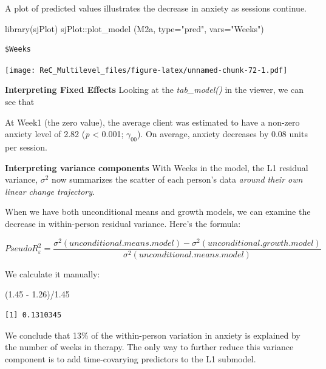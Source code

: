\documentclass[
  english,
]{book}
\newenvironment{Shaded}{\begin{snugshade}}{\end{snugshade}}
\newcommand{\AttributeTok}[1]{\textcolor[rgb]{0.77,0.63,0.00}{#1}}
\newcommand{\FloatTok}[1]{\textcolor[rgb]{0.00,0.00,0.81}{#1}}
\newcommand{\FunctionTok}[1]{\textcolor[rgb]{0.00,0.00,0.00}{#1}}
\newcommand{\NormalTok}[1]{#1}
\newcommand{\SpecialCharTok}[1]{\textcolor[rgb]{0.00,0.00,0.00}{#1}}
\newcommand{\StringTok}[1]{\textcolor[rgb]{0.31,0.60,0.02}{#1}}
\begin{document}
A plot of predicted values illustrates the decrease in anxiety as sessions continue.

\begin{Shaded}
\begin{Highlighting}[]
\FunctionTok{library}\NormalTok{(sjPlot)}
\NormalTok{sjPlot}\SpecialCharTok{::}\FunctionTok{plot\_model}\NormalTok{ (M2a, }\AttributeTok{type=}\StringTok{"pred"}\NormalTok{, }\AttributeTok{vars=}\StringTok{"Weeks"}\NormalTok{)}
\end{Highlighting}
\end{Shaded}

\begin{verbatim}
$Weeks
\end{verbatim}

\texttt{[image: ReC\_Multilevel\_files/figure-latex/unnamed-chunk-72-1.pdf]}

\textbf{Interpreting Fixed Effects}
Looking at the \emph{tab\_model()} in the viewer, we can see that

At Week1 (the zero value), the average client was estimated to have a non-zero anxiety level of 2.82 (\emph{p} \textless{} 0.001; \(\gamma _{00}\)). On average, anxiety decreases by 0.08 units per session.

\textbf{Interpreting variance components}
With Weeks in the model, the L1 residual variance, \(\sigma^{2}\) now summarizes the scatter of each person's data \emph{around their own linear change trajectory}.

When we have both unconditional means and growth models, we can examine the decrease in within-person residual variance. Here's the formula:

\[Pseudo R_{\varepsilon }^{2} = \frac{\sigma^{2}(unconditional. means. model) - \sigma^{2}(unconditional. growth. model)}{\sigma ^{2}(unconditional. means. model)}\]

We calculate it manually:

\begin{Shaded}
\begin{Highlighting}[]
\NormalTok{(}\FloatTok{1.45} \SpecialCharTok{{-}} \FloatTok{1.26}\NormalTok{)}\SpecialCharTok{/}\FloatTok{1.45}
\end{Highlighting}
\end{Shaded}

\begin{verbatim}
[1] 0.1310345
\end{verbatim}

We conclude that 13\% of the within-person variation in anxiety is explained by the number of weeks in therapy. The only way to further reduce this variance component is to add time-covarying predictors to the L1 submodel.
\end{document}
